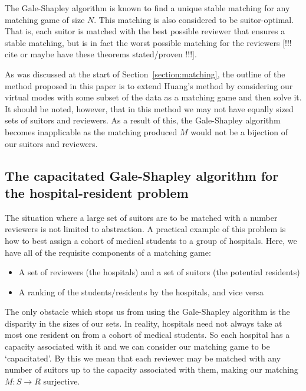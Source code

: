 \documentclass{article}
\theoremstyle{definition}
\begin{document}
The Gale-Shapley algorithm is known to find a unique stable matching for any 
matching game of size \(N\). This matching is also considered to be 
suitor-optimal. That is, each suitor is matched with the best possible reviewer
that ensures a stable matching, but is in fact the worst possible matching for 
the reviewers [!!! cite or maybe have these theorems stated/proven !!!]. 

As was discussed at the start of Section~\ref{section:matching}, the outline of
the method proposed in this paper is to extend Huang's method by considering our
virtual modes with some subset of the data as a matching game and then solve it.
It should be noted, however, that in this method we may not have equally sized 
sets of suitors and reviewers. As a result of this, the Gale-Shapley algorithm 
becomes inapplicable as the matching produced \(M\) would not be a bijection of 
our suitors and reviewers.

\subsection{The capacitated Gale-Shapley algorithm for the hospital-resident 
		problem}\label{subsection:capacitated-galeshapley}

The situation where a large set of suitors are to be matched with a number
reviewers is not limited to abstraction. A practical example of this problem is
how to best assign a cohort of medical students to a group of hospitals. Here, 
we have all of the requisite components of a matching game:

\begin{itemize}
	\item A set of reviewers (the hospitals) and a set of suitors (the potential
        residents) 
	\item A ranking of the students/residents by the hospitals, and vice versa
\end{itemize}

The only obstacle which stops us from using the Gale-Shapley algorithm is the 
disparity in the sizes of our sets. In reality, hospitals need not always take 
at most one resident on from a cohort of medical students. So each hospital has
a capacity associated with it and we can consider our matching game to be
`capacitated'. By this we mean that each reviewer may be matched with any number
of suitors up to the capacity associated with them, making our matching \(M: S 
\to R\) surjective. \\
\end{document}
